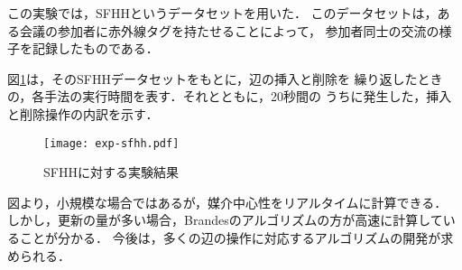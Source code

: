 この実験では，SFHH\cite{Genois2018}というデータセットを用いた．
このデータセットは，ある会議の参加者に赤外線タグを持たせることによって，
参加者同士の交流の様子を記録したものである．

図\ref{fig:exp-sfhh}は，そのSFHHデータセットをもとに，辺の挿入と削除を
繰り返したときの，各手法の実行時間を表す．それとともに，20秒間の
うちに発生した，挿入と削除操作の内訳を示す．

\begin{figure}[tb]
  \centering
  \texttt{[image: exp-sfhh.pdf]}
  \caption{SFHHに対する実験結果}
  \label{fig:exp-sfhh}
\end{figure}

図より，小規模な場合ではあるが，媒介中心性をリアルタイムに計算できる．
しかし，更新の量が多い場合，Brandesのアルゴリズムの方が高速に計算していることが分かる．
今後は，多くの辺の操作に対応するアルゴリズムの開発が求められる．
